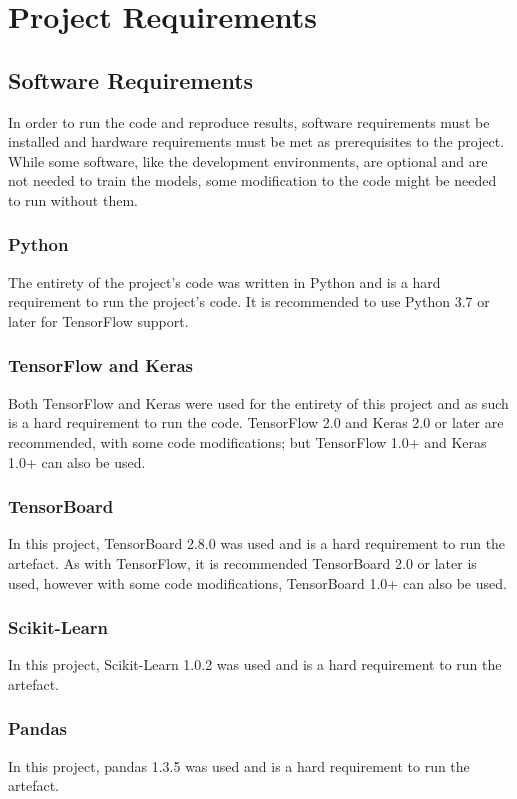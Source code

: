 \section{Project Requirements} \label{project-requirements}
\subsection{Software Requirements}
In order to run the code and reproduce results, software requirements must be installed and hardware requirements must be met as prerequisites to the project. While some software, like the development environments, are optional and are not needed to train the models, some modification to the code might be needed to run without them.

\subsubsection{Python}
The entirety of the project's code was written in Python and is a hard requirement to run the project's code. It is recommended to use Python 3.7 or later for TensorFlow support.

\subsubsection{TensorFlow and Keras}
Both TensorFlow and Keras were used for the entirety of this project and as such is a hard requirement to run the code. TensorFlow 2.0 and Keras 2.0 or later are recommended, with some code modifications; but TensorFlow 1.0+ and Keras 1.0+ can also be used.

\subsubsection{TensorBoard}
In this project, TensorBoard 2.8.0 was used and is a hard requirement to run the artefact. As with TensorFlow, it is recommended TensorBoard 2.0 or later is used, however with some code modifications, TensorBoard 1.0+ can also be used.

\subsubsection{Scikit-Learn}
In this project, Scikit-Learn 1.0.2 was used and is a hard requirement to run the artefact.

\subsubsection{Pandas}
In this project, pandas 1.3.5 was used and is a hard requirement to run the artefact.

